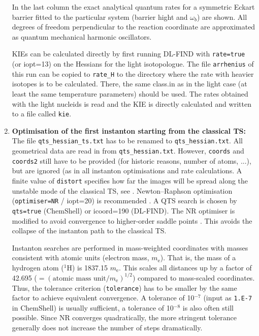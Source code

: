 \documentclass{article}
\begin{document}
\begin{enumerate}
  In the last column the exact analytical quantum rates for a
  symmetric Eckart barrier fitted to the particular system (barrier
  hight and $\omega_b$) are shown. All degrees of freedom
  perpendicular to the reaction coordinate are approximated as quantum
  mechanical harmonic oscillators.

  KIEs can be calculated directly by first running DL-FIND with
  \texttt{rate=true} (or iopt=13) on the Hessians for the light
  isotopologue. The file \texttt{arrhenius} of this run can be copied to
  \texttt{rate\_H} to the directory where the rate with heavier isotopes is to
  be calculated. There, the same class.in as in the light case (at least the
  same temperature parameters) should be used. The rates obtained with the
  light nucleids is read and the KIE is directly calculated and written to a
  file called \texttt{kie}.

\item \label{item3} \textbf{Optimisation of the first instanton
    starting from the classical TS:}  The file \texttt{qts\_hessian\_ts.txt}
  has to be renamed to \texttt{qts\_hessian.txt}. All geometrical data
  are read in from \texttt{qts\_hessian.txt}. However, \texttt{coords}
  and \texttt{coords2} still have to be provided (for historic
  reasons, number of atoms, ...), but are ignored (as in all instanton
  optimisations and rate calculations. A finite value of
  \texttt{distort} specifies how far the images will be spread along
  the unstable mode of the classical TS, see
  \cite{rom11}. Newton--Raphson optimisation (\texttt{optimiser=NR} /
  iopt=20) is recommended \cite{rom11,rom11b}. A QTS search is chosen
  by \texttt{qts=true} (ChemShell) or icoord=190 (DL-FIND).  The NR
  optimiser is modified to avoid convergence to higher-order saddle
  points \cite{rom11b}. This avoids the collapse of the instanton path
  to the classical TS.

  Instanton searches are performed in mass-weighted coordinates with masses
  consistent with atomic units (electron mass, $m_\mathrm{e}$). That is, the
  mass of a hydrogen atom ($^1$H) is 1837.15 $m_\mathrm{e}$.  This scales all
  distances up by a factor of 42.695 ($=(\mbox{atomic mass
    unit}/m_\mathrm{e})^{1/2}$) compared to mass-scaled coordinates. Thus, the
  tolerance criterion (\texttt{tolerance}) has to be smaller by the same
  factor to achieve equivalent convergence. A tolerance of 10$^{-7}$ (input as
  \texttt{1.E-7} in ChemShell) is usually sufficient, a tolerance of 10$^{-8}$
  is also often still possible. Since NR converges quadratically, the more
  stringent tolerance generally does not increase the number of steps
  dramatically.


\end{enumerate}
\end{document}

